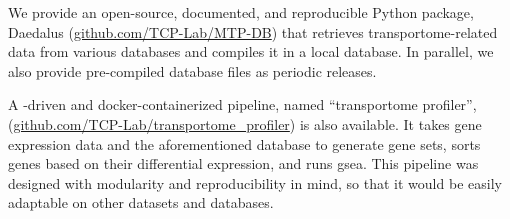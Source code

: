 We provide an open-source, documented, and reproducible Python package, Daedalus (\href{https://github.com/TCP-Lab/MTP-DB}{github.com/TCP-Lab/MTP-DB}) that retrieves transportome-related data from various databases and compiles it in a local  database.
In parallel, we also provide pre-compiled database files as periodic releases.

A -driven and docker-containerized pipeline, named ``transportome profiler'', (\href{https://github.com/TCP-Lab/transportome_profiler}{github.com/TCP-Lab/transportome\_profiler}) is also available.
It takes gene expression data and the aforementioned database to generate gene sets, sorts genes based on their differential expression, and runs \gls{gsea}.
This pipeline was designed with modularity and reproducibility in mind, so that it would be easily adaptable on other datasets and databases.
